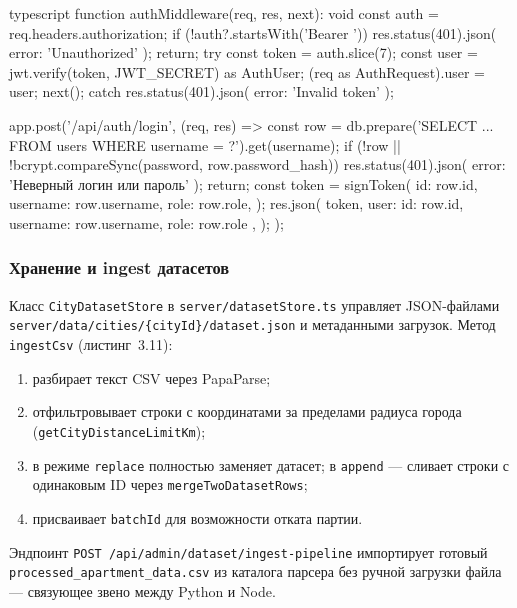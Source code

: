 \begin{singleminted}{typescript}
function authMiddleware(req, res, next): void {
    const auth = req.headers.authorization;
    if (!auth?.startsWith('Bearer ')) {
        res.status(401).json({ error: 'Unauthorized' });
        return;
    }
    try {
        const token = auth.slice(7);
        const user = jwt.verify(token, JWT_SECRET) as AuthUser;
        (req as AuthRequest).user = user;
        next();
    } catch {
        res.status(401).json({ error: 'Invalid token' });
    }
}

app.post('/api/auth/login', (req, res) => {
    const row = db.prepare('SELECT ... FROM users WHERE username = ?').get(username);
    if (!row || !bcrypt.compareSync(password, row.password_hash)) {
        res.status(401).json({ error: 'Неверный логин или пароль' });
        return;
    }
    const token = signToken({
        id: row.id, username: row.username, role: row.role,
    });
    res.json({
        token,
        user: { id: row.id, username: row.username, role: row.role },
    });
});
\end{singleminted}
\label{lst:auth}

\subsubsection{Хранение и ingest датасетов}

Класс \texttt{CityDatasetStore} в \texttt{server/datasetStore.ts} управляет JSON-файлами \texttt{server/data/cities/\{cityId\}/dataset.json} и метаданными загрузок. Метод \texttt{ingestCsv} (листинг~3.11):
\begin{enumerate}
    \item разбирает текст CSV через PapaParse;
    \item отфильтровывает строки с координатами за пределами радиуса города (\texttt{getCityDistanceLimitKm});
    \item в режиме \texttt{replace} полностью заменяет датасет; в \texttt{append} --- сливает строки с одинаковым ID через \texttt{mergeTwoDatasetRows};
    \item присваивает \texttt{batchId} для возможности отката партии.
\end{enumerate}

Эндпоинт \texttt{POST /api/admin/dataset/ingest-pipeline} импортирует готовый \texttt{processed\_apartment\_data.csv} из каталога парсера без ручной загрузки файла --- связующее звено между Python и Node.

